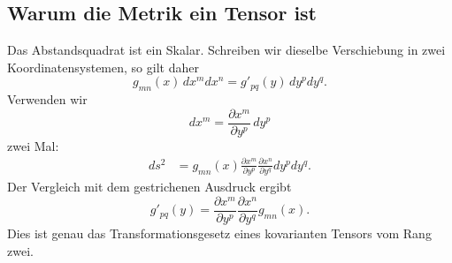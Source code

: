 \begin{classroomqa}
\end{classroomqa}

\begin{classroomqa}
\end{classroomqa}

\begin{classroomqa}
\end{classroomqa}

\subsection{Warum die Metrik ein Tensor ist}

Das Abstandsquadrat ist ein Skalar. Schreiben wir dieselbe Verschiebung in zwei Koordinatensystemen, so gilt daher
\begin{equation}
 g_{mn}(x)\,dx^m dx^n
 =
 g'_{pq}(y)\,dy^pdy^q.
\label{eq:length-invariance}
\end{equation}
Verwenden wir
\begin{equation}
 dx^m=\frac{\partial x^m}{\partial y^p}\,dy^p
\end{equation}
zwei Mal:
\begin{align}
 ds^2
 &=
 g_{mn}(x)
 \frac{\partial x^m}{\partial y^p}
 \frac{\partial x^n}{\partial y^q}
 dy^pdy^q.
\label{eq:metric-transform-derivation}
\end{align}
Der Vergleich mit dem gestrichenen Ausdruck ergibt
\begin{equation}
 g'_{pq}(y)
 =
 \frac{\partial x^m}{\partial y^p}
 \frac{\partial x^n}{\partial y^q}
 g_{mn}(x).
\label{eq:metric-transformation}
\end{equation}
Dies ist genau das Transformationsgesetz eines kovarianten Tensors vom Rang zwei.

